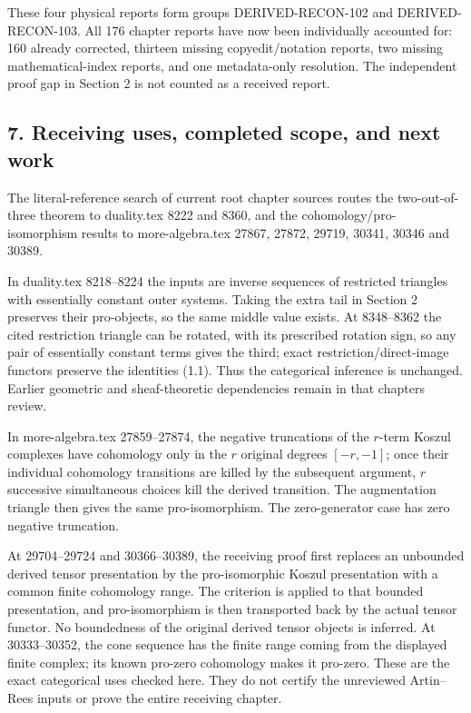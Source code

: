 These four physical reports form groups DERIVED-RECON-102 and DERIVED-RECON-103. All 176 chapter reports have now been individually accounted for:\allowbreak{} 160 already corrected,\allowbreak{} thirteen missing copyedit/\allowbreak{}notation reports,\allowbreak{} two missing mathematical-index reports,\allowbreak{} and one metadata-only resolution. The independent proof gap in Section 2 is not counted as a received report.

\subsection{\texorpdfstring{7. Receiving uses,\allowbreak{} completed scope,\allowbreak{} and next work}{7. Receiving  completed  and next work}}\label{proofs-12380-12604-receiving-uses-completed-scope-and-next-work}

The literal-reference search of current root chapter sources routes the two-out-of-three theorem to duality.tex 8222 and 8360,\allowbreak{} and the cohomology/\allowbreak{}pro-isomorphism results to more-algebra.tex 27867,\allowbreak{} 27872,\allowbreak{} 29719,\allowbreak{} 30341,\allowbreak{} 30346 and 30389.

In duality.tex 8218–\allowbreak{}8224 the inputs are inverse sequences of restricted triangles with essentially constant outer systems. Taking the extra tail in Section 2 preserves their pro-objects,\allowbreak{} so the same middle value exists. At 8348–\allowbreak{}8362 the cited restriction triangle can be rotated,\allowbreak{} with its prescribed rotation sign,\allowbreak{} so any pair of essentially constant terms gives the third; exact restriction/\allowbreak{}direct-image functors preserve the identities (1.1)\allowbreak{}. Thus the categorical inference is unchanged. Earlier geometric and sheaf-theoretic dependencies remain in that chapter\textquotesingle s review.

In more-algebra.tex 27859–\allowbreak{}27874,\allowbreak{} the negative truncations of the \(r\)-term Koszul complexes have cohomology only in the \(r\) original degrees \([-r,-1]\); once their individual cohomology transitions are killed by the subsequent argument,\allowbreak{} \(r\) successive simultaneous choices kill the derived transition. The augmentation triangle then gives the same pro-isomorphism. The zero-generator case has zero negative truncation.

At 29704–\allowbreak{}29724 and 30366–\allowbreak{}30389,\allowbreak{} the receiving proof first replaces an unbounded derived tensor presentation by the pro-isomorphic Koszul presentation with a common finite cohomology range. The criterion is applied to that bounded presentation,\allowbreak{} and pro-isomorphism is then transported back by the actual tensor functor. No boundedness of the original derived tensor objects is inferred. At 30333–\allowbreak{}30352,\allowbreak{} the cone sequence has the finite range coming from the displayed finite complex; its known pro-zero cohomology makes it pro-zero. These are the exact categorical uses checked here. They do not certify the unreviewed Artin–\allowbreak{}Rees inputs or prove the entire receiving chapter.

